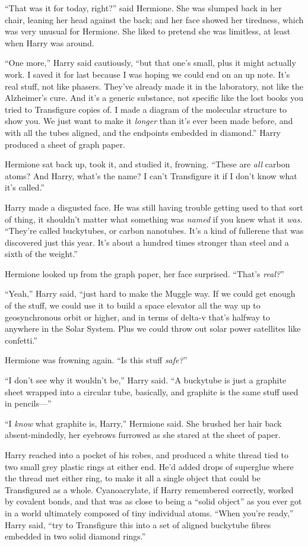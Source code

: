 “That was it for today, right?” said Hermione. She was slumped back in her chair, leaning her head against the back; and her face showed her tiredness, which was very unusual for Hermione. She liked to pretend she was limitless, at least when Harry was around.

“One more,” Harry said cautiously, “but that one’s small, plus it might actually work. I saved it for last because I was hoping we could end on an up note. It’s real stuff, not like phasers. They’ve already made it in the laboratory, not like the Alzheimer’s cure. And it’s a generic substance, not specific like the lost books you tried to Transfigure copies of. I made a diagram of the molecular structure to show you. We just want to make it \emph{longer} than it’s ever been made before, and with all the tubes aligned, and the endpoints embedded in diamond.” Harry produced a sheet of graph paper.

Hermione sat back up, took it, and studied it, frowning. “These are \emph{all} carbon atoms? And Harry, what’s the name? I can’t Transfigure it if I don’t know what it’s called.”

Harry made a disgusted face. He was still having trouble getting used to that sort of thing, it shouldn’t matter what something was \emph{named} if you knew what it \emph{was.} “They’re called buckytubes, or carbon nanotubes. It’s a kind of fullerene that was discovered just this year. It’s about a hundred times stronger than steel and a sixth of the weight.”

Hermione looked up from the graph paper, her face surprised. “That’s \emph{real?}”

“Yeah,” Harry said, “just hard to make the Muggle way. If we could get enough of the stuff, we could use it to build a space elevator all the way up to geosynchronous orbit or higher, and in terms of delta-v that’s halfway to anywhere in the Solar System. Plus we could throw out solar power satellites like confetti.”

Hermione was frowning again. “Is this stuff \emph{safe?}”

“I don’t see why it wouldn’t be,” Harry said. “A buckytube is just a graphite sheet wrapped into a circular tube, basically, and graphite is the same stuff used in pencils—”

“I \emph{know} what graphite is, Harry,” Hermione said. She brushed her hair back absent-mindedly, her eyebrows furrowed as she stared at the sheet of paper.

Harry reached into a pocket of his robes, and produced a white thread tied to two small grey plastic rings at either end. He’d added drops of superglue where the thread met either ring, to make it all a single object that could be Transfigured as a whole. Cyanoacrylate, if Harry remembered correctly, worked by covalent bonds, and that was as close to being a “solid object” as you ever got in a world ultimately composed of tiny individual atoms. “When you’re ready,” Harry said, “try to Transfigure this into a set of aligned buckytube fibres embedded in two solid diamond rings.”


